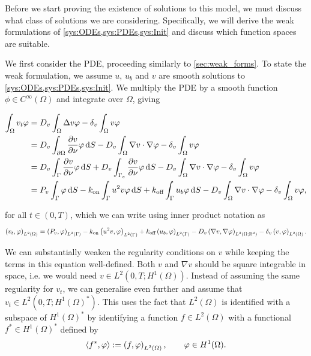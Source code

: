Before we start proving the existence of solutions to this model, we must discuss what class of solutions we are considering. Specifically, we will derive the weak formulations of \cref{sys:ODEs,sys:PDEs,sys:Init} and discuss which function spaces are suitable.

We first consider the PDE, proceeding similarly to \cref{sec:weak_forms}. To state the weak formulation, we assume $u$, $u_b$ and $v$ are smooth solutions to \cref{sys:ODEs,sys:PDEs,sys:Init}. We multiply the PDE by a smooth function $\phi \in C^\infty(\Omega)$ and integrate over $\Omega$, giving

%
\begin{equation*}
    \begin{aligned}
        \int_\Omega v_t \phi &= D_v \int_\Omega \Delta v \phi - \delta_v \int_{\Omega} v \phi \\
                                &= D_v \int_{\partial \Omega} \pderiv[v]{\nu} \phi  \d S - D_v \int_\Omega \nabla v \cdot \nabla \phi - \delta_v \int_{\Omega} v \phi \\
                                &= D_v \int_{\Gamma} \pderiv[v]{\nu} \phi \d S + D_v \int_{\Gamma_e} \pderiv[v]{\nu} \phi  \d S - D_v \int_\Omega \nabla v \cdot \nabla \phi - \delta_v \int_{\Omega} v \phi \\
                                &= P_v \int_{\Gamma} \phi \d S - \kon \int_{\Gamma} u^2 v \phi \d S + \koff \int_{\Gamma} u_b \phi \d S - D_v \int_\Omega \nabla v \cdot \nabla \phi - \delta_v \int_{\Omega} v \phi, \\
    \end{aligned}
\end{equation*}

\noindent
for all $t \in (0, T)$, which we can write using inner product notation as
%
\begin{equation*}
    \inner{v_t, \phi}_{\Ltwo{\Omega}} = \inner{P_v, \phi}_{\Ltwo{\Gamma}} - \kon \inner{u^2 v, \phi}_{\Ltwo{\Gamma}} + \koff \inner{u_b, \phi}_{\Ltwo{\Gamma}} - D_v \inner{\nabla v, \nabla \phi}_{\Ltwo{\Omega; \R^d}} - \delta_v \inner{v, \phi}_{\Ltwo{\Omega}}.
\end{equation*}

\noindent
We can substantially weaken the regularity conditions on $v$ while keeping the terms in this equation well-defined. Both $v$ and $\nabla v$ should be square integrable in space, i.e. we would need $v \in L^2(0, T; H^1(\Omega))$. Instead of assuming the same regularity for $v_t$, we can generalise even further and assume that $v_t \in L^2(0, T; H^1(\Omega)^*)$. This uses the fact that $L^2(\Omega)$ is identified with a subspace of $H^1(\Omega)^*$ by identifying a function $f \in L^2(\Omega)$ with a functional $f^* \in H^1(\Omega)^*$ defined by
%
\begin{equation*}
    \pair{f^*, \phi} := \inner{f, \phi}_{\Ltwo{\Omega}}, \qquad \phi \in H^1(\Omega).
\end{equation*}

